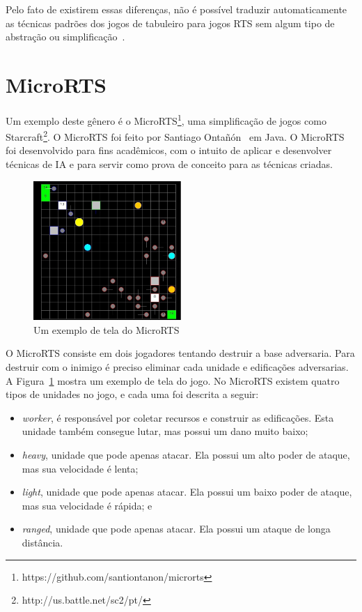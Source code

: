 Pelo fato de existirem essas diferenças, não é possível traduzir automaticamente as técnicas padrões dos jogos de tabuleiro para jogos RTS sem algum tipo de abstração ou simplificação~\cite{ontanon2013survey}.

\section{MicroRTS}  

Um exemplo deste gênero é o MicroRTS\footnote{https://github.com/santiontanon/microrts}, uma simplificação de jogos como Starcraft\footnote{http://us.battle.net/sc2/pt/}. O MicroRTS foi feito por Santiago Ontañón~\cite{ontanon2013combinatorial} em Java. O MicroRTS foi desenvolvido para fins acadêmicos, com o intuito de aplicar e desenvolver técnicas de IA e para servir como prova de conceito para as técnicas criadas.

\begin{figure}[ht]
	\centering
	\includegraphics[width=0.5\textwidth]{fig/microrts.pdf}
	\caption{Um exemplo de tela do MicroRTS}
	\label{fig:microrts}
\end{figure} 

O MicroRTS consiste em dois jogadores tentando destruir a base adversaria. Para destruir com o inimigo é preciso eliminar cada unidade e edificações adversarias. A Figura~\ref{fig:microrts} mostra um exemplo de tela do jogo.
No MicroRTS existem quatro tipos de unidades no jogo, e cada uma foi descrita a seguir:

\begin{itemize}
	\item \textit{worker}, é responsável por coletar recursos e construir as edificações. Esta unidade também consegue lutar, mas possui um dano muito baixo;
	\item \textit{heavy}, unidade que pode apenas atacar. Ela possui um alto poder de ataque, mas sua velocidade é lenta;
	\item \textit{light}, unidade que pode apenas atacar. Ela possui um baixo poder de ataque, mas sua velocidade é rápida; e
	\item \textit{ranged}, unidade que pode apenas atacar. Ela possui um ataque de longa distância. 
\end{itemize} 

